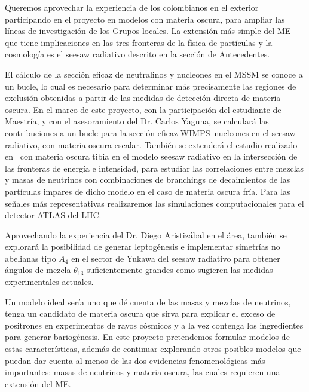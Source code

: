 \begin{darkmatter}
  Queremos aprovechar la experiencia de los colombianos en el exterior
  participando en el proyecto en modelos con materia oscura, para
  ampliar las líneas de investigación de los Grupos locales. La
  extensión más simple del ME que tiene implicaciones en las tres
  fronteras de la física de partículas y la cosmología es el seesaw
  radiativo descrito en la sección de Antecedentes.

  El cálculo de la sección eficaz de neutralinos y nucleones en el
  MSSM se conoce a un bucle, lo cual es necesario para determinar más
  precisamente las regiones de exclusión obtenidas a partir de las
  medidas de detección directa de materia oscura. En el marco de este
  proyecto, con la participación del estudiante de Maestría, y con el
  asesoramiento del Dr. Carlos Yaguna, se calculará las contribuciones
  a un bucle para la sección eficaz WIMPS--nucleones en el seesaw
  radiativo, con materia oscura escalar. También se extenderá el
  estudio realizado en~\cite{Sierra:2008wj} con materia oscura tibia
  en el modelo seesaw radiativo en la intersección de las fronteras de
  energía e intensidad, para estudiar las correlaciones entre mezclas
  y masas de neutrinos con combinaciones de branchings de decaimientos
  de las partículas impares de dicho modelo en el caso de materia
  oscura fría. Para las señales más representativas realizaremos las
  simulaciones computacionales para el detector ATLAS del LHC.
\end{darkmatter}

\begin{leptogenesis}
  Aprovechando la experiencia del Dr. Diego Aristizábal en el área,
  también se explorará la posibilidad de generar leptogénesis e
  implementar simetrías no abelianas tipo $A_4$ en el sector de Yukawa
  del seesaw radiativo para obtener ángulos de mezcla $\theta_{13}$
  suficientemente grandes como sugieren las medidas experimentales
  actuales.
\end{leptogenesis}

Un modelo ideal sería uno que dé cuenta de las masas y mezclas de
neutrinos, tenga un candidato de materia oscura que sirva para explicar
el exceso de positrones en experimentos de rayos cósmicos y a la vez
contenga los ingredientes para generar bariogénesis.  En este
proyecto pretendemos formular modelos de estas características, además
de continuar explorando otros posibles modelos que puedan dar cuenta
al menos de las dos evidencias fenomenológicas más importantes: masas
de neutrinos y materia oscura, las cuales requieren una extensión del
ME.

